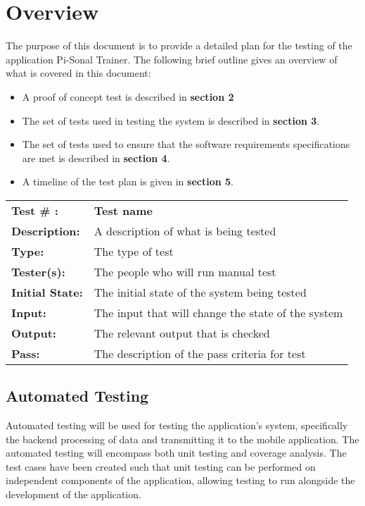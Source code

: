 \documentclass{article}
\newenvironment{testcase}
    {
    \begin{center}
    \begin{mdframed}[
        userdefinedwidth=15.5cm,
        leftmargin=1cm,
        rightmargin=1cm
        ]
    \begin{tabular}{p{2.5cm} p{9cm}}
    }
    {
    \end{tabular}
    \end{mdframed}
    \end{center}
    }
\newcommand{\tctit}[2]{\textbf{#1} & \textbf{#2}}
\newcommand{\tcdesc}{\textbf{Description:}}
\newcommand{\tctype}{\textbf{Type:}}
\newcommand{\testers}{\textbf{Tester(s):}}
\newcommand{\tcpass}{\textbf{Pass:}}
\begin{document}
\section{Overview}
The purpose of this document is to provide a detailed plan for the testing of the application  Pi-Sonal Trainer. The following brief outline gives an overview of what is covered in this document:
\begin{itemize}
    \item A proof of concept test is described in \textbf{section 2}
    \item The set of tests used in testing the system is described in \textbf{section 3}.
    \item The set of tests used to ensure that the software requirements specifications are met is described in \textbf{section 4}.
    \item A timeline of the test plan is given in \textbf{section 5}. 
\end{itemize}

\begingroup
\begin{testcase}
    \tctit{Test \# :}{Test name} \\
    \tcdesc & A description of what is being tested \\
    \tctype & The type of test \\
    \testers & The people who will run manual test \\
    \textbf{Initial State:} & The initial state of the system being tested \\
    \textbf{Input:} & The input that will change the state of the system \\
    \textbf{Output:} & The relevant output that is checked \\
    \tcpass & The description of the pass criteria for test\\
\end{testcase}
\endgroup

\subsection{Automated Testing}
 Automated testing will be used for testing the application’s system, specifically the backend processing of data and transmitting it to the mobile application. The automated testing will encompass both unit testing and coverage analysis. The test cases have been created such that unit testing can be performed on independent components of the application, allowing testing to run alongside the development of the application.
 
\end{document}
